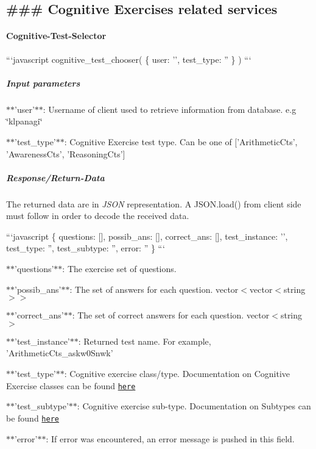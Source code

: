 \subsection*{\#\#\# Cognitive Exercises related services }

\paragraph*{Cognitive-\/\-Test-\/\-Selector}

```javascript cognitive\-\_\-test\-\_\-chooser( \{ user\-: '', test\-\_\-type\-: '' \} ) ```

\subparagraph*{Input parameters}


\begin{DoxyItemize}
\item $\ast$$\ast$'user'$\ast$$\ast$\-: Username of client used to retrieve information from database. e.\-g \char`\"{}klpanagi\char`\"{}
\item $\ast$$\ast$'test\-\_\-type'$\ast$$\ast$\-: Cognitive Exercise test type. Can be one of \mbox{[}'Arithmetic\-Cts', 'Awareness\-Cts', 'Reasoning\-Cts'\mbox{]}
\end{DoxyItemize}

\subparagraph*{Response/\-Return-\/\-Data}

The returned data are in {\itshape J\-S\-O\-N} representation. A J\-S\-O\-N.\-load() from client side must follow in order to decode the received data.

```javascript \{ questions\-: \mbox{[}\mbox{]}, possib\-\_\-ans\-: \mbox{[}\mbox{]}, correct\-\_\-ans\-: \mbox{[}\mbox{]}, test\-\_\-instance\-: '', test\-\_\-type\-: '', test\-\_\-subtype\-: '', error\-: '' \} ```


\begin{DoxyItemize}
\item $\ast$$\ast$'questions'$\ast$$\ast$\-: The exercise set of questions.
\item $\ast$$\ast$'possib\-\_\-ans'$\ast$$\ast$\-: The set of answers for each question. vector$<$vector$<$string$>$$>$
\item $\ast$$\ast$'correct\-\_\-ans'$\ast$$\ast$\-: The set of correct answers for each question. vector$<$string$>$
\item $\ast$$\ast$'test\-\_\-instance'$\ast$$\ast$\-: Returned test name. For example, 'Arithmetic\-Cts\-\_\-askw0\-Snwk'
\item $\ast$$\ast$'test\-\_\-type'$\ast$$\ast$\-: Cognitive exercise class/type. Documentation on Cognitive Exercise classes can be found \href{https://github.com/rapp-project/rapp-platform/tree/CognitiveSystem/rapp_cognitive_exercise}{\tt here}
\item $\ast$$\ast$'test\-\_\-subtype'$\ast$$\ast$\-: Cognitive exercise sub-\/type. Documentation on Subtypes can be found \href{https://github.com/rapp-project/rapp-platform/tree/CognitiveSystem/rapp_cognitive_exercise}{\tt here}
\item $\ast$$\ast$'error'$\ast$$\ast$\-: If error was encountered, an error message is pushed in this field.
\end{DoxyItemize}

